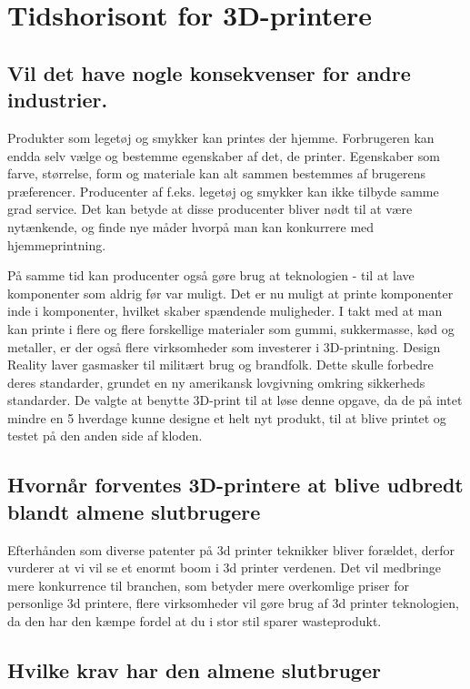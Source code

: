 
\chapter{Tidshorisont for 3D-printere}
\section{Vil det have nogle konsekvenser for andre industrier.}


Produkter som legetøj og smykker kan printes der hjemme. Forbrugeren kan endda selv vælge og bestemme egenskaber af det, de printer. Egenskaber som farve, størrelse, form og materiale kan alt sammen bestemmes af brugerens præferencer. Producenter af f.eks. legetøj og smykker kan ikke tilbyde samme grad service. Det kan betyde at disse producenter bliver nødt til at være nytænkende, og finde nye måder hvorpå man kan konkurrere med hjemmeprintning.

På samme tid kan producenter også gøre brug at teknologien -{} til at lave komponenter som aldrig før var muligt. Det er nu muligt at printe komponenter inde i komponenter, hvilket skaber spændende muligheder.
I takt med at man kan printe i flere og flere forskellige materialer som gummi, sukkermasse, kød og metaller, er der også flere virksomheder som investerer i 3D-printning.
Design Reality laver gasmasker til militært brug og brandfolk. Dette skulle forbedre deres standarder, grundet en ny amerikansk lovgivning omkring sikkerheds standarder. De valgte at benytte 3D-print til at løse denne opgave, da de på intet mindre en 5 hverdage kunne designe et helt nyt produkt, til at blive printet og testet på den anden side af kloden. \cite{3ders.org_design_2013}

\section{Hvornår forventes 3D-printere at blive udbredt blandt almene slutbrugere}

Efterhånden som diverse patenter på 3d printer teknikker bliver forældet, derfor vurderer \cite{manyika_disruptive_2013} at vi vil se et enormt boom i 3d printer verdenen. Det vil medbringe mere konkurrence til branchen, som betyder mere overkomlige priser for personlige 3d printere, flere virksomheder vil gøre brug af 3d printer teknologien, da den har den kæmpe fordel at du i stor stil sparer wasteprodukt. 

\section{Hvilke krav har den almene slutbruger}

